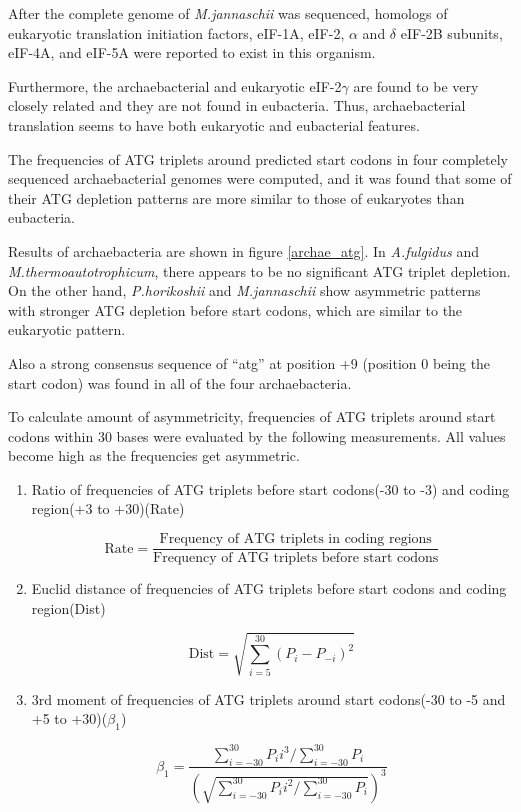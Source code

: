 After the complete genome of {\it M.jannaschii}\cite{label2080} was
sequenced, homologs of eukaryotic translation initiation factors,
eIF-1A, eIF-2, $\alpha$ and $\delta$ eIF-2B subunits, eIF-4A, and
eIF-5A were reported to exist in this organism\cite{label2080,label2014,label2015}.

Furthermore, the archaebacterial and eukaryotic eIF-2$\gamma$ are
found to be very closely related and they are not found in
eubacteria\cite{label2052}. Thus, archaebacterial translation seems to
have both eukaryotic and eubacterial features\cite{label2020}.

The frequencies of ATG triplets around predicted start codons in four
completely sequenced archaebacterial genomes were computed, and it was
found that some of their ATG depletion patterns are more similar to
those of eukaryotes than eubacteria.

Results of archaebacteria are shown in figure \ref{archae_atg}. 
In {\it A.fulgidus} and {\it M.thermoautotrophicum}, there appears to
be no significant ATG triplet depletion. On the other hand, {\it
P.horikoshii} and {\it M.jannaschii} show asymmetric patterns with
stronger ATG depletion before start codons, which are similar to the
eukaryotic pattern.

Also a strong consensus sequence of ``atg'' at position +9 (position 0
being the start codon) was found in all of the four archaebacteria.

To calculate amount of asymmetricity, frequencies of ATG triplets
around start codons within 30 bases were evaluated by the following
measurements. All values become high as the frequencies get asymmetric.

\begin{enumerate}
\item Ratio of frequencies of ATG triplets before start codons(-30 to -3) and coding region(+3 to +30)(Rate)

\[ \mbox{Rate} = \frac{\mbox{Frequency of ATG triplets in coding regions}}{\mbox{Frequency of ATG triplets before start codons}}
\]

\item Euclid distance of frequencies of ATG triplets before start codons and coding region(Dist)

\[
\mbox{Dist} = \sqrt{\sum_{i=5}^{30}(P_{i} - P_{-i})^2}
\]

\item 3rd moment of frequencies of ATG triplets around start codons(-30 to -5 and +5 to +30)(\(\beta_{1}\))

\[
\beta_{1} = \frac{\sum_{i=-30}^{30}P_{i}i^{3}/\sum_{i=-30}^{30}P_{i}}{\left(\sqrt{\sum_{i=-30}^{30}P_{i}i^{2}/\sum_{i=-30}^{30}P_{i}}\right)^3}
\]
\end{enumerate}

